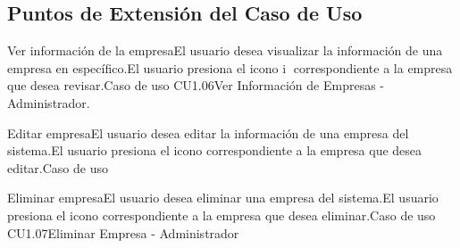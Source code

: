 	
	\subsection{Puntos de Extensión del Caso de Uso}
	

	
	\begin{UCExtenssionPoint}{Ver información de la empresa}{El usuario desea visualizar la información de una empresa en específico.}{El usuario presiona el icono \textcircled{i} correspondiente a la empresa que desea revisar.}{Caso de uso \cdtRef
	{CU1.06}{Ver Información de Empresas - Administrador}.} 
	\end{UCExtenssionPoint}
	\begin{UCExtenssionPoint}{Editar empresa}{El usuario desea editar la información de una empresa del sistema.}{El usuario presiona el icono \faEdit correspondiente a la empresa que desea editar.}{Caso de uso } 
	\end{UCExtenssionPoint}
	\begin{UCExtenssionPoint}{Eliminar empresa}{El usuario desea eliminar una empresa del sistema.}{El usuario presiona el icono \faTrashO correspondiente a la empresa que desea eliminar.}{Caso de uso \cdtRef
	{CU1.07}{Eliminar Empresa - Administrador}}
	\end{UCExtenssionPoint}


